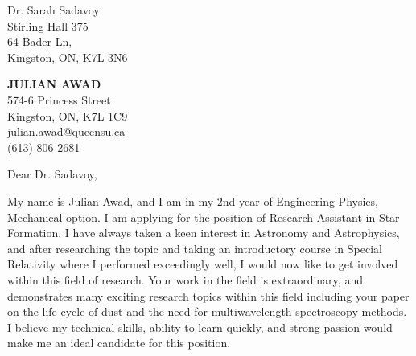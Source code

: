 \documentclass[11pt]{letter} %
\begin{document}
\begin{letter}{Dr. Sarah Sadavoy \\
Stirling Hall 375 \\
64 Bader Ln, \\
Kingston, ON, K7L 3N6}

\begin{center}
\textbf{\huge JULIAN AWAD} \\ %
\vspace{1em} %
574-6 Princess Street \\ Kingston, ON, K7L 1C9 \\ julian.awad@queensu.ca \\ (613) 806-2681 %
\end{center}
\hspace{2em}
\signature{Julian Awad} %
\vspace{-0.3in}
\opening{Dear Dr. Sadavoy,}

My name is Julian Awad, and I am in my 2nd year of Engineering Physics, Mechanical option. I am applying for the position of Research Assistant in Star Formation. I have always taken a keen interest in Astronomy and Astrophysics, and after researching the topic and taking an introductory course in Special Relativity where I performed exceedingly well, I would now like to get involved within this field of research. Your work in the field is extraordinary, and demonstrates many exciting research topics within this field including your paper on the life cycle of dust and the need for multiwavelength spectroscopy methods. I believe my technical skills, ability to learn quickly, and strong passion would make me an ideal candidate for this position.


\end{letter}
\end{document}
